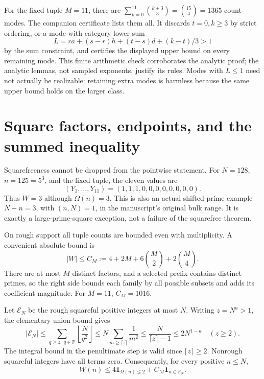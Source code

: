 \documentclass[11pt]{article}
\newcommand{\ind}{\mathbf 1}
\newcommand{\PP}{\mathbb P}
\newcommand{\Om}{\Omega}
\begin{document}
For the fixed tuple $M=11$, there are
$\sum_{k=0}^{11}\binom{k+3}{3}=\binom{15}{4}=1365$ count modes.
The companion certificate lists them all. It discards $t=0,k\ge3$
by strict ordering, or a mode with category lower sum
\[
 L=r a+(s-r)h+(t-s)d+(k-t)/3>1
\]
by the sum constraint, and certifies the displayed upper bound on every
remaining mode. This finite arithmetic check corroborates the analytic
proof; the analytic lemmas, not sampled exponents, justify its rules.
Modes with $L\le1$ need not actually be realizable: retaining extra modes
is harmless because the same upper bound holds on the larger class.

\section{Square factors, endpoints, and the summed inequality}
Squarefreeness cannot be dropped from the pointwise statement. For
$N=128$, $n=125=5^3$, and the fixed tuple, the eleven values are
\[
 (Y_1,\ldots,Y_{11})=(1,1,1,0,0,0,0,0,0,0,0).
\]
Thus $W=3$ although $\Om(n)=3$. This is also an actual shifted-prime
example $N-n=3$, with $(n,N)=1$, in the manuscript's original bulk range.
It is exactly a large-prime-square exception, not a failure of the
squarefree theorem.

On rough support all tuple counts are bounded even with multiplicity.
A convenient absolute bound is
\begin{equation}\label{eq:uniform-weight}
 |W|\le C_M:=4+2M+6\binom M2+2\binom M4.
\end{equation}
There are at most $M$ distinct factors, and a selected prefix contains
distinct primes, so the right side bounds each family by all possible
subsets and adds its coefficient magnitude. For $M=11$, $C_M=1016$.

Let $\mathcal E_N$ be the rough squareful positive integers at most $N$.
Writing $z=N^a>1$, the elementary union bound gives
\begin{equation}\label{eq:square-error}
 |\mathcal E_N|\le\sum_{q\ge z,\ q\in\PP}\left\lfloor\frac N{q^2}\right\rfloor
 \le N\sum_{m\ge\lceil z\rceil}\frac1{m^2}
 \le\frac N{\lceil z\rceil-1}
 \le2N^{1-a}\quad(z\ge2).
\end{equation}
The integral bound in the penultimate step is valid since
$\lceil z\rceil\ge2$. Nonrough squareful integers have all terms zero.
Consequently, for every positive $n\le N$,
\[
 W(n)\le4\ind_{\Om(n)\le2}+C_M\ind_{n\in\mathcal E_N}.
\]
\end{document}
